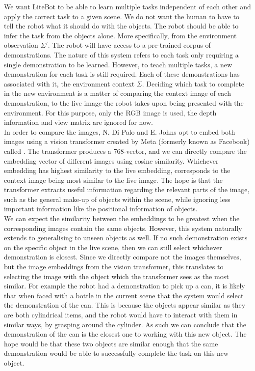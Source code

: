We want LiteBot to be able to learn multiple tasks independent of each other and apply the correct task to a given scene. We do not want the human to have to tell the robot what it should do with the objects. The robot should be able to infer the task from the objects alone. More specifically, from the environment observation $\Sigma'$.
The robot will have access to a pre-trained corpus of demonstrations. The  nature of this system refers to each task only requiring a single demonstration to be learned. However, to teach multiple tasks, a new demonstration for each task is still required. Each of these demonstrations has associated with it, the environment context $\Sigma$. Deciding which task to complete in the new environment is a matter of comparing the context image of each demonstration, to the live image the robot takes upon being presented with the environment. For this purpose, only the RGB image is used, the depth information and view matrix are ignored for now.\\

In order to compare the images, N. Di Palo and E. Johns opt to embed both images using a vision transformer created by Meta (formerly known as Facebook) called  \cite{dino-paper}. The transformer produces a 768-vector, and we can directly compare the embedding vector of different images using cosine similarity. Whichever embedding has highest similarity to the live embedding, corresponds to the context image being most similar to the live image. The hope is that the transformer extracts useful information regarding the relevant parts of the image, such as the general make-up of objects within the scene, while ignoring less important information like the positional information of objects.\\

We can expect the similarity between the embeddings to be greatest when the corresponding images contain the same objects. However, this system naturally extends to generalising to unseen objects as well. If no such demonstration exists on the specific object in the live scene, then we can still select whichever demonstration is closest. Since we directly compare not the images themselves, but the image embeddings from the vision transformer, this translates to selecting the image with the object which the transformer sees as the most similar. For example the robot had a demonstration to pick up a can, it is likely that when faced with a bottle in the current scene that the system would select the demonstration of the can. This is because the objects appear similar as they are both cylindrical items, and the robot would have to interact with them in similar ways, by grasping around the cylinder. As such we can conclude that the demonstration of the can is the closest one to working with this new object. The hope would be that these two objects are similar enough that the same demonstration would be able to successfully complete the task on this new object.


